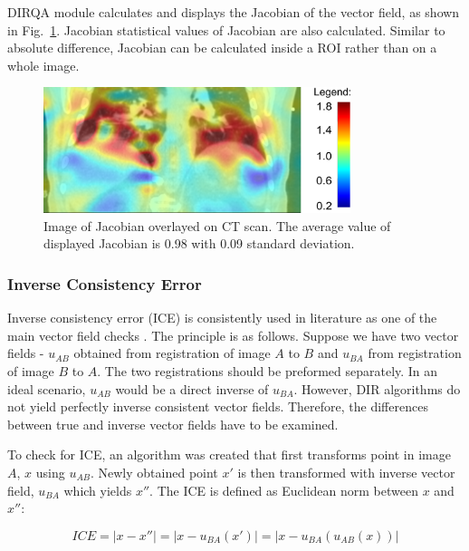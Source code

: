 \documentclass[type=dr, dr=rernat, accentcolor=tud7b,colorbacktitle, bigchapter, openright, twoside, 12pt ]{tudthesis}
\begin{document}
DIRQA module calculates and displays the Jacobian of the vector field, as shown in Fig.~\ref{JacobianImage}. Jacobian statistical values of Jacobian are also calculated. Similar to absolute difference, Jacobian can be calculated inside a ROI rather than on a whole image.

\begin{figure}[H]
	\begin{center}		
		\includegraphics[width=0.8\textwidth]{./Images/jacobian.png}
		\caption{Image of Jacobian overlayed on CT scan. The average value of displayed Jacobian is 0.98 with 0.09 standard deviation.}
		\label{JacobianImage}
	\end{center}
\end{figure}

\subsubsection{Inverse Consistency Error}
\label{ICE}

Inverse consistency error (ICE) is consistently used in literature as one of the main vector field checks \cite{Christensen2001, Bender2009}. The principle is as follows. Suppose we have two vector fields - $u_{AB}$ obtained from registration of image $A$ to $B$ and $u_{BA}$ from registration of image $B$ to $A$. The two registrations
should be preformed separately. In an ideal scenario, $u_{AB}$ would be a direct inverse of $u_{BA}$. However, DIR algorithms do not yield perfectly inverse consistent vector fields. Therefore, the differences between true and inverse vector fields have to be examined.


To check for ICE, an algorithm was created that first transforms point in image $A$, $x$ using $u_{AB}$. Newly obtained point $x'$ is then transformed with inverse vector
field, $u_{BA}$ which yields $x''$. The ICE is defined as Euclidean norm between $x$ and $x''$:

\begin{equation}
\label{eq:ice}
ICE = |x - x''| = |x - u_{BA}(x')| = |x - u_{BA}(u_{AB}(x))|
\end{equation}
\end{document}
